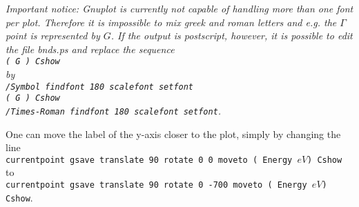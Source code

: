 \documentclass[aps,twocolumn,a4]{revtex4}
\begin{document}
{\it Important notice: Gnuplot is currently not capable of handling more than
one font per plot. Therefore it is impossible to mix greek and roman
letters and e.g. the $\Gamma$ point is represented by $G$.
If the output is postscript, however, it is possible to edit the file
bnds.ps and replace the sequence\\ {\tt ( G ) Cshow}\\ by \\
{\tt /Symbol findfont 180 scalefont setfont\\ ( G ) Cshow\\ /Times-Roman
findfont 180 scalefont setfont}.

One can  move the label of the
y-axis closer to the plot, simply by changing the line\\
{\tt currentpoint gsave translate 90 rotate 0 0 moveto ( Energy \(eV\)) Cshow}\\
to\\
{\tt currentpoint gsave translate 90 rotate 0 -700 moveto ( Energy \(eV\)) Cshow}.\\
}
\end{document}

